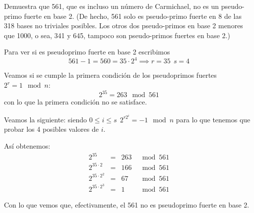 \begin{problem}[17]
Demuestra que 561, que es incluso un número de Carmichael, no es un
pseudo-primo fuerte en base 2. (De hecho, 561 solo es pseudo-primo
fuerte en 8 de las 318 bases no triviales posibles. Los otros dos
pseudo-primos en base 2 menores que 1000, o sea, 341 y 645,
tampoco son pseudo-primos fuertes en base 2.)
\solution


Para ver si es pseudoprimo fuerte en base 2 escribimos
\[561 - 1 = 560 = 35 \cdot 2^4 \implies r=35 \ \ s=4\]

Veamos si se cumple la primera condición de los pseudoprimos fuertes $2^r = 1 \mod n$:
\[ 2^{35}=263 \mod 561 \]
con lo que la primera condición no se satisface.

Veamos la siguiente: siendo $0 \leq i \leq s \ \ 2^{r2^i}=-1 \mod n$ para lo que tenemos que probar los 4 posibles valores de $i$.

Así obtenemos:
\[\begin{array}{rcrl}
2^{35} & = & 263 & \mod 561 \\
2^{35\cdot 2} & = & 166  & \mod 561\\
2^{35 \cdot 2^2} & = & 67 & \mod 561\\
2^{35\cdot 2^3} & = & 1 & \mod 561
\end{array}\]

Con lo que vemos que, efectivamente, el 561 no es pseudoprimo fuerte en base 2.

\end{problem}


